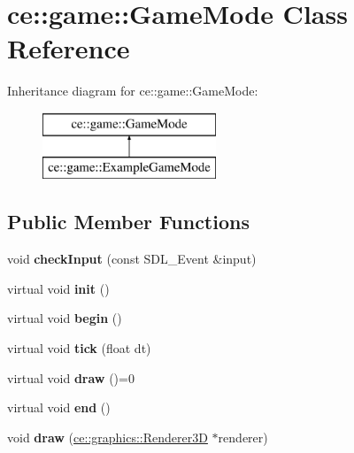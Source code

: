 \hypertarget{classce_1_1game_1_1_game_mode}{}\section{ce\+:\+:game\+:\+:Game\+Mode Class Reference}
\label{classce_1_1game_1_1_game_mode}
Inheritance diagram for ce\+:\+:game\+:\+:Game\+Mode\+:\begin{figure}[H]
\begin{center}
\leavevmode
\includegraphics[height=2.000000cm]{classce_1_1game_1_1_game_mode}
\end{center}
\end{figure}
\subsection*{Public Member Functions}
\begin{DoxyCompactItemize}
\item 
\mbox{\label{classce_1_1game_1_1_game_mode_a69e86b5a58df6b151ddb6916edf30715}} 
void {\bfseries check\+Input} (const S\+D\+L\+\_\+\+Event \&input)
\item 
\mbox{\label{classce_1_1game_1_1_game_mode_a43931c8e739b445b13cc024aaf003ba0}} 
virtual void {\bfseries init} ()
\item 
\mbox{\label{classce_1_1game_1_1_game_mode_a39d9f02347519e8abad23fde6884edf5}} 
virtual void {\bfseries begin} ()
\item 
\mbox{\label{classce_1_1game_1_1_game_mode_af67c1ea425459b53db1d0abd0f549090}} 
virtual void {\bfseries tick} (float dt)
\item 
\mbox{\label{classce_1_1game_1_1_game_mode_a5ccf2272ba8548386429b52f7a090eb0}} 
virtual void {\bfseries draw} ()=0
\item 
\mbox{\label{classce_1_1game_1_1_game_mode_a332548788e31a178c64877e5cc8c0cda}} 
virtual void {\bfseries end} ()
\item 
\mbox{\label{classce_1_1game_1_1_game_mode_a82f96a29888897674176e628cd2a7c0d}} 
void {\bfseries draw} (\hyperlink{classce_1_1graphics_1_1_renderer3_d}{ce\+::graphics\+::\+Renderer3D} $\ast$renderer)
\end{DoxyCompactItemize}
